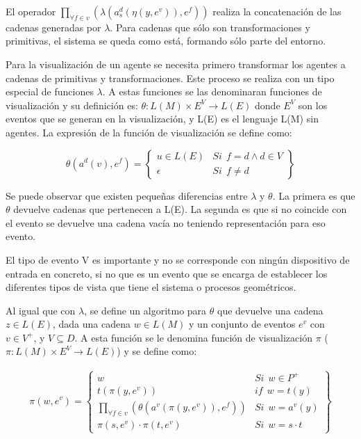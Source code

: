 \documentclass[runningheads]{llncs}
\begin{document}
El operador $\underset{\forall f \in v}{ \prod }(\lambda (a^{d}_{s} (\eta (y, e^v)), e^f))$ realiza la concatenaci\'on de las cadenas generadas por $\lambda$. Para cadenas que s\'olo son transformaciones y primitivas, el sistema se queda como est\'a, formando s\'olo parte del entorno.

Para la visualizaci\'on de un agente se necesita primero transformar los agentes a cadenas de primitivas y transformaciones. Este proceso se realiza con un tipo especial de funciones $\lambda$. A estas funciones se las denominaran funciones de visualizaci\'on y su definici\'on es: $\theta: L(M) \times E^V \rightarrow L(E)$ donde $E^V$ son los eventos que se generan en la visualizaci\'on, y L(E) es el lenguaje L(M) sin agentes. La expresi\'on de la funci\'on de visualizaci\'on se define como:

\begin{equation}
    \theta (a^d(v), e^f) =
    \left\{
    \begin{array}{ll}
        u \in L(E) & \mathit{Si}  \ \ f = d \wedge d \in V \\
        \epsilon  & \mathit{Si}  \ \ f \neq d
    \end{array}\right\}
\end{equation}

Se puede observar que existen peque\~{n}as diferencias entre $\lambda$ y $\theta$. La primera es que $\theta$ devuelve cadenas que pertenecen a L(E). La segunda es que si no coincide con el evento se devuelve una cadena vac\'ia no teniendo representaci\'on para eso evento.
	
El tipo de evento V es importante y no se corresponde con ning\'un dispositivo de entrada en concreto, si no que es un evento que se encarga de establecer los diferentes tipos de vista que tiene el sistema o procesos geom\'etricos.

Al igual que con $\lambda$, se define un algoritmo para $\theta$ que devuelve una cadena $z \in L(E)$, dada una cadena $w \in L(M)$ y un conjunto de eventos $e^v$ con $v \in V^+$, y $V \subseteq D $. A esta funci\'on se le denomina funci\'on de visualizaci\'on $\pi$ ($\pi: L(M) \times E^V \rightarrow L(E)$) y se define como:

\begin{equation}
   \begin{array}{c}
    \pi (w, e^v) = \left\{
    \begin{array}{ll}
        w   & \mathit{Si}  \ \ w \in P^+  \\
        t(\pi (y, e^v))     & \mathit{if}  \ \  w = t(y)  \\
        \underset{\forall f \in v}{ \prod }(\theta (a^v (\pi(y, e^v)), e^f))    & \mathit{Si}  \ \ w = a^v(y) \\
        \pi (s, e^v) \cdot \pi (t, e^v)    & \mathit{Si}  \ \  w = s \cdot t
    \end{array}\right\} \\
   \end{array}
\end{equation}
\end{document}
